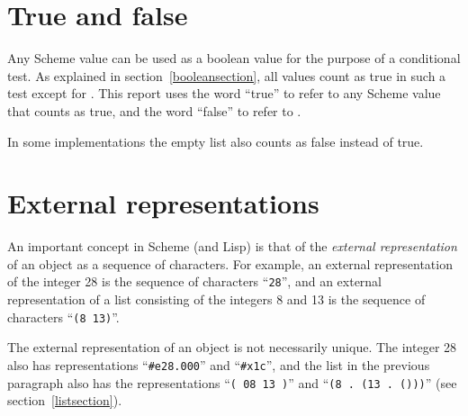 



\section{True and false}

Any Scheme value can be used as a boolean value for the purpose of a
conditional test.  As explained in section~\ref{booleansection}, all
values count as true in such a test except for \schfalse{}.
This report uses the word ``true'' to refer to any
Scheme value that counts as true, and the word ``false'' to refer to
\schfalse{}.  

\begin{note}
In some implementations the empty list also counts as false instead
of true.
\end{note}



\section{External representations}
\label{externalreps}

An important concept in Scheme (and Lisp) is that of the {\em external
representation} of an object as a sequence of characters.  For example,
an external representation of the integer 28 is the sequence of
characters ``{\tt 28}'', and an external representation of a list consisting
of the integers 8 and 13 is the sequence of characters ``{\tt(8 13)}''.

The external representation of an object is not necessarily unique.  The
integer 28 also has representations ``{\tt \#e28.000}'' and ``{\tt\#x1c}'', and the
list in the previous paragraph also has the representations ``{\tt( 08 13
)}'' and ``{\tt(8 .\ (13 .\ ()))}'' (see section~\ref{listsection}).


